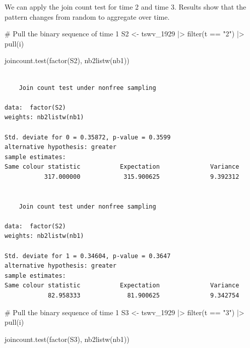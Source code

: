 \documentclass[
  letterpaper,
  DIV=11,
  numbers=noendperiod]{scrreprt}
\newenvironment{Shaded}{\begin{snugshade}}{\end{snugshade}}
\newcommand{\CommentTok}[1]{\textcolor[rgb]{0.37,0.37,0.37}{#1}}
\newcommand{\FunctionTok}[1]{\textcolor[rgb]{0.28,0.35,0.67}{#1}}
\newcommand{\NormalTok}[1]{\textcolor[rgb]{0.00,0.23,0.31}{#1}}
\newcommand{\OtherTok}[1]{\textcolor[rgb]{0.00,0.23,0.31}{#1}}
\newcommand{\SpecialCharTok}[1]{\textcolor[rgb]{0.37,0.37,0.37}{#1}}
\newcommand{\StringTok}[1]{\textcolor[rgb]{0.13,0.47,0.30}{#1}}
\begin{document}
We can apply the join count test for time 2 and time 3. Results show
that the pattern changes from random to aggregate over time.

\begin{Shaded}
\begin{Highlighting}[]
\CommentTok{\# Pull the binary sequence of time 1}
\NormalTok{S2 }\OtherTok{\textless{}{-}}\NormalTok{ tswv\_1929 }\SpecialCharTok{|\textgreater{}}
  \FunctionTok{filter}\NormalTok{(t }\SpecialCharTok{==} \StringTok{"2"}\NormalTok{) }\SpecialCharTok{|\textgreater{}}
  \FunctionTok{pull}\NormalTok{(i)}

\FunctionTok{joincount.test}\NormalTok{(}\FunctionTok{factor}\NormalTok{(S2),}
               \FunctionTok{nb2listw}\NormalTok{(nb1))}
\end{Highlighting}
\end{Shaded}

\begin{verbatim}

    Join count test under nonfree sampling

data:  factor(S2) 
weights: nb2listw(nb1) 

Std. deviate for 0 = 0.35872, p-value = 0.3599
alternative hypothesis: greater
sample estimates:
Same colour statistic           Expectation              Variance 
           317.000000            315.900625              9.392312 


    Join count test under nonfree sampling

data:  factor(S2) 
weights: nb2listw(nb1) 

Std. deviate for 1 = 0.34604, p-value = 0.3647
alternative hypothesis: greater
sample estimates:
Same colour statistic           Expectation              Variance 
            82.958333             81.900625              9.342754 
\end{verbatim}

\begin{Shaded}
\begin{Highlighting}[]
\CommentTok{\# Pull the binary sequence of time 1}
\NormalTok{S3 }\OtherTok{\textless{}{-}}\NormalTok{ tswv\_1929 }\SpecialCharTok{|\textgreater{}}
  \FunctionTok{filter}\NormalTok{(t }\SpecialCharTok{==} \StringTok{"3"}\NormalTok{) }\SpecialCharTok{|\textgreater{}}
  \FunctionTok{pull}\NormalTok{(i)}

\FunctionTok{joincount.test}\NormalTok{(}\FunctionTok{factor}\NormalTok{(S3), }
                \FunctionTok{nb2listw}\NormalTok{(nb1))}
\end{Highlighting}
\end{Shaded}
\end{document}
